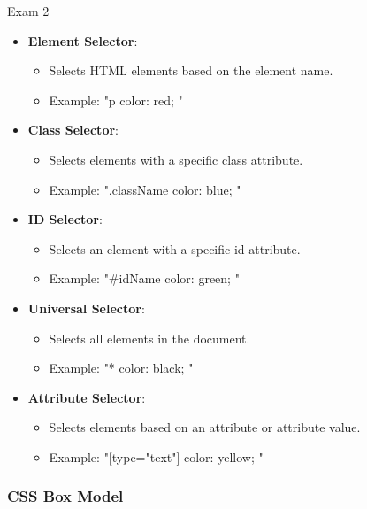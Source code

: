\begin{examnotes}{Exam 2}
\begin{highlight}
        \begin{itemize}
            \item \textbf{Element Selector}:
                \begin{itemize}
                    \item Selects HTML elements based on the element name.
                    \item Example: "p { color: red; }"
                \end{itemize}
            \item \textbf{Class Selector}:
                \begin{itemize}
                    \item Selects elements with a specific class attribute.
                    \item Example: ".className { color: blue; }"
                \end{itemize}
            \item \textbf{ID Selector}:
                \begin{itemize}
                    \item Selects an element with a specific id attribute.
                    \item Example: "#idName { color: green; }"
                \end{itemize}
            \item \textbf{Universal Selector}:
                \begin{itemize}
                    \item Selects all elements in the document.
                    \item Example: "* { color: black; }"
                \end{itemize}
            \item \textbf{Attribute Selector}:
                \begin{itemize}
                    \item Selects elements based on an attribute or attribute value.
                    \item Example: "[type="text"] { color: yellow; }"
                \end{itemize}
        \end{itemize}
    \end{highlight}
    
    \subsubsection*{CSS Box Model}
    

\end{examnotes}
